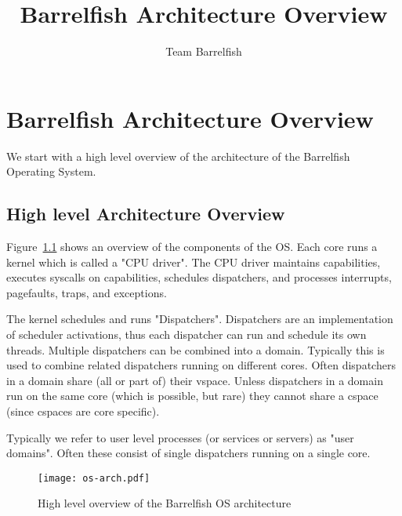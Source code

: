 \documentclass[a4paper,twoside]{report} %
\title{Barrelfish Architecture Overview}   %
\author{Team Barrelfish}	%
\begin{document}
\maketitle

%
%
\begin{versionhistory}
\end{versionhistory}




\chapter{Barrelfish Architecture Overview}

We start with a high level overview of the architecture of the Barrelfish
Operating System.

\section{High level Architecture Overview}\label{sec:overview}
Figure~\ref{fig:os-arch} shows an overview of the components of the OS.  Each
core runs a kernel which is called a "CPU driver". The CPU driver maintains
capabilities, executes syscalls on capabilities, schedules dispatchers, and
processes interrupts, pagefaults, traps, and exceptions.

The kernel schedules and runs "Dispatchers". Dispatchers are an implementation
of scheduler activations, thus each dispatcher can run and schedule its own
threads.  Multiple dispatchers can be combined into a domain. Typically this is
used to combine related dispatchers running on different cores. Often
dispatchers in a domain share (all or part of) their vspace. Unless dispatchers
in a domain run on the same core (which is possible, but rare) they cannot share
a cspace (since cspaces are core specific).

Typically we refer to user level processes (or services or servers) as "user
domains". Often these consist of single dispatchers running on a single core.

\begin{figure}[hbt]
 \begin{center}
 \texttt{[image: os-arch.pdf]}
 \end{center}
 \caption{High level overview of the Barrelfish OS architecture}\label{fig:os-arch}
\end{figure}
\end{document}
